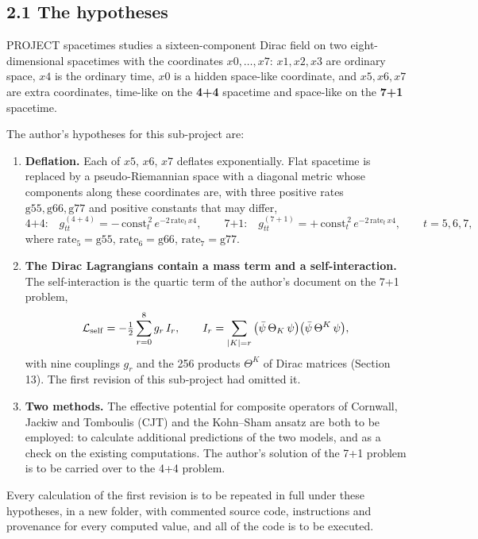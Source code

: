 \documentclass[
  10pt,
]{article}
\providecommand{\tightlist}{%
  \setlength{\itemsep}{0pt}\setlength{\parskip}{0pt}}
\begin{document}
\hypertarget{the-hypotheses}{%
\subsection{2.1 The hypotheses}\label{the-hypotheses}}

PROJECT spacetimes studies a sixteen-component Dirac field on two
eight-dimensional spacetimes with the coordinates \(x0,\dots,x7\):
\(x1,x2,x3\) are ordinary space, \(x4\) is the ordinary time, \(x0\) is
a hidden space-like coordinate, and \(x5,x6,x7\) are extra coordinates,
time-like on the \textbf{4+4} spacetime and space-like on the
\textbf{7+1} spacetime.

The author's hypotheses for this sub-project are:

\begin{enumerate}
\def\labelenumi{\arabic{enumi}.}
\tightlist
\item
  \textbf{Deflation.} Each of \(x5\), \(x6\), \(x7\) deflates
  exponentially. Flat spacetime is replaced by a pseudo-Riemannian space
  with a diagonal metric whose components along these coordinates are,
  with three positive rates \(\mathrm{g55},\mathrm{g66},\mathrm{g77}\)
  and positive constants that may differ,
  \[\text{4+4:}\quad g^{(4+4)}_{tt}=-\,\mathrm{const}_t^{\,2}\,e^{-2\,\mathrm{rate}_t\,x4},\qquad
  \text{7+1:}\quad g^{(7+1)}_{tt}=+\,\mathrm{const}_t^{\,2}\,e^{-2\,\mathrm{rate}_t\,x4},\qquad t=5,6,7,\]
  where \(\mathrm{rate}_5=\mathrm{g55}\),
  \(\mathrm{rate}_6=\mathrm{g66}\), \(\mathrm{rate}_7=\mathrm{g77}\).
\item
  \textbf{The Dirac Lagrangians contain a mass term and a
  self-interaction.} The self-interaction is the quartic term of the
  author's document on the 7+1 problem,
  \[\mathcal L_{\rm self}=-\tfrac12\sum_{r=0}^{8}g_r\,I_r,\qquad
  I_r=\sum_{|K|=r}\big(\bar\psi\,\Theta_K\,\psi\big)\big(\bar\psi\,\Theta^K\,\psi\big),\]
  with nine couplings \(g_r\) and the 256 products \(\Theta^K\) of Dirac
  matrices (Section 13). The first revision of this sub-project had
  omitted it.
\item
  \textbf{Two methods.} The effective potential for composite operators
  of Cornwall, Jackiw and Tomboulis (CJT) and the Kohn--Sham ansatz are
  both to be employed: to calculate additional predictions of the two
  models, and as a check on the existing computations. The author's
  solution of the 7+1 problem is to be carried over to the 4+4 problem.
\end{enumerate}

Every calculation of the first revision is to be repeated in full under
these hypotheses, in a new folder, with commented source code,
instructions and provenance for every computed value, and all of the
code is to be executed.
\end{document}
